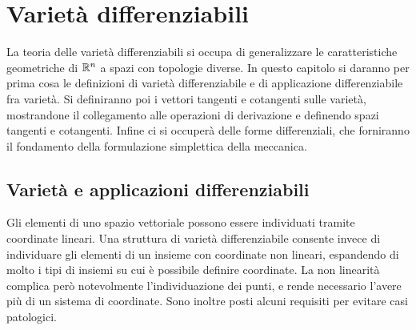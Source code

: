 \chapter{Varietà differenziabili}
La teoria delle varietà differenziabili si occupa di generalizzare le caratteristiche geometriche di $\mathbb{R}^n$ a spazi con topologie diverse. In questo capitolo si daranno per prima cosa le definizioni di varietà differenziabile e di applicazione differenziabile fra varietà. Si definiranno poi i vettori tangenti e cotangenti sulle varietà, mostrandone il collegamento alle operazioni di derivazione e definendo spazi tangenti e cotangenti. Infine ci si occuperà delle forme differenziali, che forniranno il fondamento della formulazione simplettica della meccanica.

\section{Varietà e applicazioni differenziabili} \label{sec:smoothMfd}
Gli elementi di uno spazio vettoriale possono essere individuati tramite coordinate lineari. Una struttura di varietà differenziabile consente invece di individuare gli elementi di un insieme con coordinate non lineari, espandendo di molto i tipi di insiemi su cui è possibile definire coordinate. La non linearità complica però notevolmente l'individuazione dei punti, e rende necessario l'avere più di un sistema di coordinate. Sono inoltre posti alcuni requisiti per evitare casi patologici.

